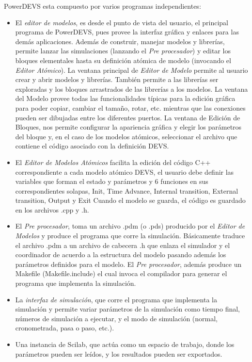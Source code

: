 	PowerDEVS esta compuesto por varios programas independientes:
	\begin{itemize}
		\item El \emph{editor de modelos}, es desde el punto de vista del usuario, el principal programa de PowerDEVS, pues provee la interfaz gráfica 
			y enlaces para las demás aplicaciones. 
		Además de construir, manejar modelos y librerías, permite lanzar las simulaciones (lanzando el \emph{Pre procesador}) y editar los bloques 
		elementales hasta su definición atómica de modelo (invocando el \emph{Editor Atómico}).
		La ventana principal de \emph{Editor de Modelo} permite al usuario crear y abrir modelos y librerías. También permite a las librerías ser 
		exploradas y los bloques arrastrados de las librerías a los modelos.
		La ventana del Modelo provee todas las funcionalidades típicas para la edición gráfica para poder copiar, cambiar el tamaño, rotar, etc. mientras 
		que las conexiones pueden ser dibujadas entre los diferentes puertos.
		La ventana de Edición de Bloques, nos permite configurar la apariencia gráfica y elegir los parámetros del bloque y, en el caso de los modelos 
		atómicos, seleccionar el archivo que contiene el código asociado con la definición DEVS.

		\item El \emph{Editor de Modelos Atómicos} facilita la edición del código C++ correspondiente a cada modelo atómico DEVS, el usuario debe 
		definir las variables que forman el estado y parámetros y 6 funciones en sus correspondientes solapas, Init, Time Advance, Internal transition, 
		External transition, Output y Exit  
		Cuando el modelo se guarda, el código es guardado en los archivos .cpp y .h. 

		\item El \emph{Pre procesador}, toma un archivo .pdm (o .pds) producido por el \emph{Editor de Modelos} y produce el programa que corre 
		la simulación. Básicamente traduce el archivo .pdm a un archivo de cabecera .h que enlaza el simulador y el coordinador de acuerdo a la 
		estructura del modelo pasando además los parámetros definidos para el modelo.
		El \emph{Pre procesador}, además produce un Makefile (Makefile.include) el cual invoca el compilador para generar el programa que implementa 
		la simulación.

		\item La \emph{interfaz de simulación}, que corre el programa que implementa la simulación y permite variar parámetros de la simulación 
		como tiempo final, números de simulación a ejecutar, y el modo de simulación (normal, cronometrada, pasa o paso, etc.).

		\item Una instancia de Scilab, que actúa como un espacio de trabajo, donde los parámetros pueden ser leídos, y los resultados pueden ser exportados.
	\end{itemize}


